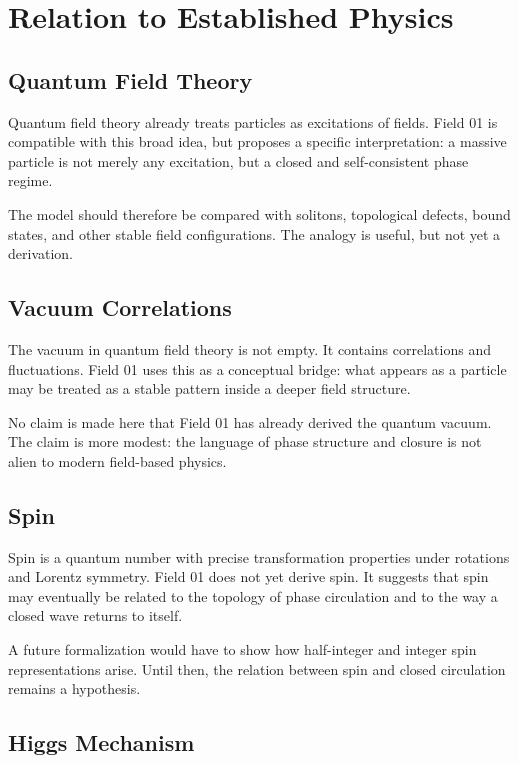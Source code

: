 \documentclass[11pt,a4paper]{article}
\begin{document}
\section{Relation to Established Physics}

\subsection*{Quantum Field Theory}

Quantum field theory already treats particles as excitations of fields. Field 01 is compatible with this broad idea, but proposes a specific interpretation: a massive particle is not merely any excitation, but a closed and self-consistent phase regime.

The model should therefore be compared with solitons, topological defects, bound states, and other stable field configurations. The analogy is useful, but not yet a derivation.

\subsection*{Vacuum Correlations}

The vacuum in quantum field theory is not empty. It contains correlations and fluctuations. Field 01 uses this as a conceptual bridge: what appears as a particle may be treated as a stable pattern inside a deeper field structure.

No claim is made here that Field 01 has already derived the quantum vacuum. The claim is more modest: the language of phase structure and closure is not alien to modern field-based physics.

\subsection*{Spin}

Spin is a quantum number with precise transformation properties under rotations and Lorentz symmetry. Field 01 does not yet derive spin. It suggests that spin may eventually be related to the topology of phase circulation and to the way a closed wave returns to itself.

A future formalization would have to show how half-integer and integer spin representations arise. Until then, the relation between spin and closed circulation remains a hypothesis.

\subsection*{Higgs Mechanism}
\end{document}
